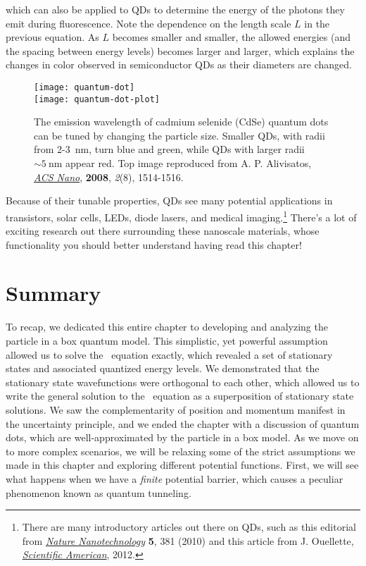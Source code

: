 which can also be applied to QDs to determine the energy of the photons they emit during fluorescence. Note the dependence on the length scale $L$ in the previous equation. As $L$ becomes smaller and smaller, the allowed energies (and the spacing between energy levels) becomes larger and larger, which explains the changes in color observed in semiconductor QDs as their diameters are changed.

\begin{figure}[!h]
	\centering
	\texttt{[image: quantum-dot]} \\
	\texttt{[image: quantum-dot-plot]}
	\caption{The emission wavelength of cadmium selenide (CdSe) quantum dots can be tuned by changing the particle size. Smaller QDs, with radii from 2-\SI{3}{\nano\meter}, turn blue and green, while QDs with larger radii $\sim\SI{5}{\nano\meter}$ appear red. Top image reproduced from A. P. Alivisatos, \href{http://pubs.acs.org/doi/abs/10.1021/nn800485f1}{\emph{ACS Nano}}, \textbf{2008}, \emph{2}(8), 1514-1516.}
	\label{fig:qdot}
\end{figure}

Because of their tunable properties, QDs see many potential applications in transistors, solar cells, LEDs, diode lasers, and medical imaging.\footnote{There are many introductory articles out there on QDs, such as this editorial from \href{http://www.nature.com/nnano/journal/v5/n6/full/nnano.2010.127.html}{\emph{Nature Nanotechnology}} \textbf{5}, 381 (2010) and this article from J. Ouellette, \href{https://blogs.scientificamerican.com/cocktail-party-physics/quantum-dots-of-many-colors/}{\emph{Scientific American}}, 2012.} There's a lot of exciting research out there surrounding these nanoscale materials, whose functionality you should better understand having read this chapter!


\section{Summary}
To recap, we dedicated this entire chapter to developing and analyzing the particle in a box quantum model. This simplistic, yet powerful assumption allowed us to solve the \Sch\ equation exactly, which revealed a set of stationary states and associated quantized energy levels. We demonstrated that the stationary state wavefunctions were orthogonal to each other, which allowed us to write the general solution to the \Sch\ equation as a superposition of stationary state solutions. We saw the complementarity of position and momentum manifest in the uncertainty principle, and we ended the chapter with a discussion of quantum dots, which are well-approximated by the particle in a box model. As we move on to more complex scenarios, we will be relaxing some of the strict assumptions we made in this chapter and exploring different potential functions. First, we will see what happens when we have a \emph{finite} potential barrier, which causes a peculiar phenomenon known as quantum tunneling.


%